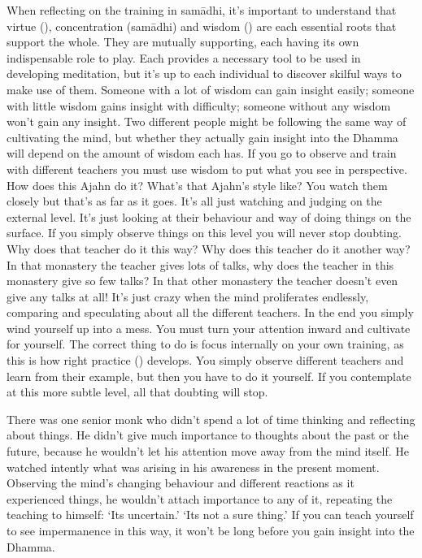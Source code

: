 When reflecting on the training in sam\=adhi, it's important to understand that virtue (), concentration (sam\=adhi) and wisdom () are each essential roots that support the whole. They are mutually supporting, each having its own indispensable role to play. Each provides a necessary tool to be used in developing meditation, but it's up to each individual to discover skilful ways to make use of them. Someone with a lot of wisdom can gain insight easily; someone with little wisdom gains insight with difficulty; someone without any wisdom won't gain any insight. Two different people might be following the same way of cultivating the mind, but whether they actually gain insight into the Dhamma will depend on the amount of wisdom each has. If you go to observe and train with different teachers you must use wisdom to put what you see in perspective. How does this Ajahn do it? What's that Ajahn's style like? You watch them closely but that's as far as it goes. It's all just watching and judging on the external level. It's just looking at their behaviour and way of doing things on the surface. If you simply observe things on this level you will never stop doubting. Why does that teacher do it this way? Why does this teacher do it another way? In that monastery the teacher gives lots of talks, why does the teacher in this monastery give so few talks? In that other monastery the teacher doesn't even give any talks at all! It's just crazy when the mind proliferates endlessly, comparing and speculating about all the different teachers. In the end you simply wind yourself up into a mess. You must turn your attention inward and cultivate for yourself. The correct thing to do is focus internally on your own training, as this is how right practice () develops. You simply observe different teachers and learn from their example, but then you have to do it yourself. If you contemplate at this more subtle level, all that doubting will stop.

There was one senior monk who didn't spend a lot of time thinking and reflecting about things. He didn't give much importance to thoughts about the past or the future, because he wouldn't let his attention move away from the mind itself. He watched intently what was arising in his awareness in the present moment. Observing the mind's changing behaviour and different reactions as it experienced things, he wouldn't attach importance to any of it, repeating the teaching to himself: `Its uncertain.' `Its not a sure thing.' If you can teach yourself to see impermanence in this way, it won't be long before you gain insight into the Dhamma. 

